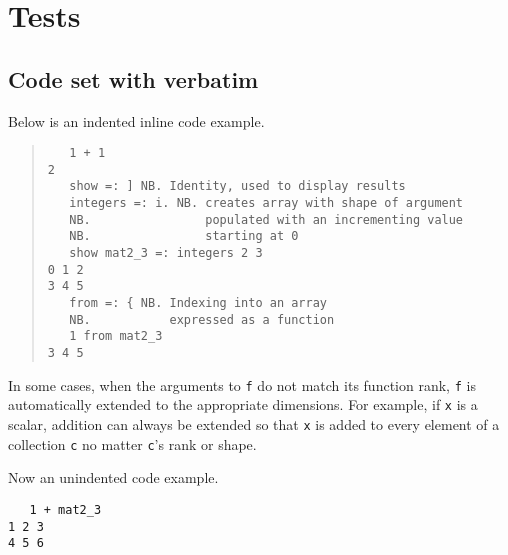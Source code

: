 \chapter{Tests}

\section{Code set with verbatim}
Below is an indented inline code example.

\begin{quote}
\begin{singlespacing}
\begin{small}
\begin{verbatim}
   1 + 1
2
   show =: ] NB. Identity, used to display results
   integers =: i. NB. creates array with shape of argument
   NB.                populated with an incrementing value
   NB.                starting at 0
   show mat2_3 =: integers 2 3
0 1 2
3 4 5
   from =: { NB. Indexing into an array
   NB.           expressed as a function
   1 from mat2_3
3 4 5
\end{verbatim}
\end{small}
\end{singlespacing}
\end{quote}

\noindent
In some cases, when the arguments to \texttt{f} do not match its function rank, \texttt{f} is automatically extended to the appropriate dimensions.
For example, if \texttt{x} is a scalar, addition can always be extended so that \texttt{x} is added to every element of a collection \texttt{c} 
no matter \texttt{c}'s rank or shape. 

Now an unindented code example.

\begin{singlespacing}
\begin{small}
\begin{verbatim}
   1 + mat2_3
1 2 3
4 5 6
\end{verbatim}
\end{small}
\end{singlespacing}

